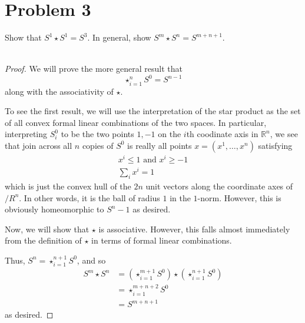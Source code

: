 \documentclass[fontsize=11pt]{scrartcl} %
\numberwithin{equation}{section} %
\numberwithin{figure}{section} %
\numberwithin{table}{section} %
\newcommand{\R}{\mathbb{R}}
\begin{document}
\section*{Problem 3}
Show that $S^1\star S^1=S^3$. In general, show $S^m\star S^n= S^{m+n+1}$.
\\
\\
\begin{proof}
    We will prove the more general result that
    \[
        \star_{i=1}^n S^0 = S^{n-1}
    \]
    along with the associativity of $\star$.

    To see the first result, we will use the interpretation of the star product
    as the set of all convex formal linear combinations of the two spaces. In
    particular, interpreting $S^0_i$ to be the two points $1,-1$ on the $i$th
    coodinate axis in $\R^n$, we see that join across all $n$ copies of $S^0$ is
    really all points $x=(x^1,\ldots,x^n)$ satisfying
    \[
        \begin{aligned}
            x^i\leq 1 \textrm{ and } x^i\geq -1\\
            \sum_i x^i = 1
        \end{aligned}
    \]
    which is just the convex hull of the $2n$ unit vectors along the coordinate
    axes of $/R^n$. In other words, it is the ball of radius $1$ in the
    $1$-norm. However, this is obviously homeomorphic to $S^n-1$ as desired.

    Now, we will show that $\star$ is associative. However, this falls almost
    immediately from the definition of $\star$ in terms of formal linear
    combinations.

    Thus, $S^n = \star_{i=1}^{n+1}S^0$, and so
    \[
        \begin{aligned}
            S^m\star S^n &=
            (\star_{i=1}^{m+1}S^0)\star(\star_{i=1}^{n+1}S^0)\\
            &=\star_{i=1}^{m+n+2}S^0\\
            &= S^{m+n+1}
        \end{aligned}
    \]
    as desired.
\end{proof}
\end{document}
